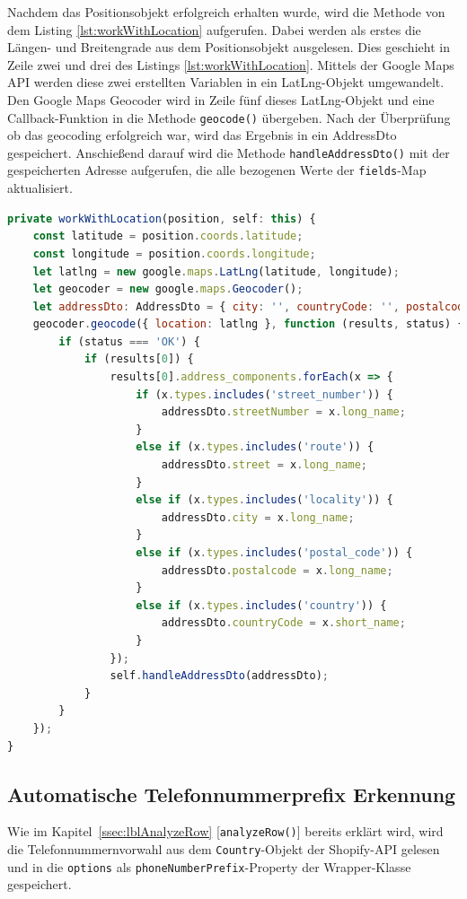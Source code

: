 Nachdem das Positionsobjekt erfolgreich erhalten wurde, wird die Methode von dem Listing \ref{lst:workWithLocation} aufgerufen. Dabei werden als erstes die Längen- und Breitengrade aus dem Positionsobjekt ausgelesen. Dies geschieht in Zeile zwei und drei des Listings \ref{lst:workWithLocation}. Mittels der Google Maps API werden diese zwei erstellten Variablen in ein LatLng-Objekt umgewandelt.\autocite{latLngObjekt} Den Google Maps Geocoder wird in Zeile fünf dieses LatLng-Objekt und eine Callback-Funktion in die Methode \texttt{geocode()} übergeben. Nach der Überprüfung ob das geocoding erfolgreich war, wird das Ergebnis in ein AddressDto gespeichert. Anschießend darauf wird die Methode \texttt{handleAddressDto()} mit der gespeicherten Adresse aufgerufen, die alle bezogenen Werte der \texttt{fields}-Map aktualisiert.

\begin{lstlisting}[caption={Die \texttt{workWithLocation()}-Methode der \texttt{StreetComponent}-Klasse}, language=JavaScript,label={lst:workWithLocation}]
private workWithLocation(position, self: this) {
	const latitude = position.coords.latitude;
	const longitude = position.coords.longitude;
	let latlng = new google.maps.LatLng(latitude, longitude);
	let geocoder = new google.maps.Geocoder();
	let addressDto: AddressDto = { city: '', countryCode: '', postalcode: '', street: '', streetNumber: '' };
	geocoder.geocode({ location: latlng }, function (results, status) {
		if (status === 'OK') {
			if (results[0]) {
				results[0].address_components.forEach(x => {
					if (x.types.includes('street_number')) {
						addressDto.streetNumber = x.long_name;
					}
					else if (x.types.includes('route')) {
						addressDto.street = x.long_name;
					}
					else if (x.types.includes('locality')) {
						addressDto.city = x.long_name;
					}
					else if (x.types.includes('postal_code')) {
						addressDto.postalcode = x.long_name;
					}
					else if (x.types.includes('country')) {
						addressDto.countryCode = x.short_name;
					}
				});
				self.handleAddressDto(addressDto);
			}
		}
	});
}
\end{lstlisting}

\subsection{Automatische Telefonnummerprefix Erkennung}

Wie im Kapitel~\ref{ssec:lblAnalyzeRow} [\texttt{analyzeRow()}] bereits erklärt wird, wird die Telefonnummernvorwahl aus dem \texttt{Country}-Objekt der Shopify-API gelesen und in die \texttt{options} als \texttt{phoneNumberPrefix}-Property der Wrapper-Klasse gespeichert.